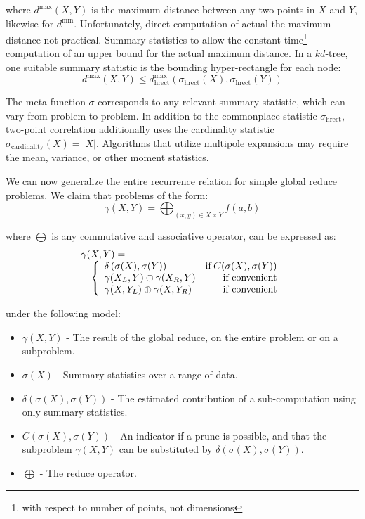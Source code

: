 \documentclass[times, 10pt,twocolumn]{article}
\DeclareMathOperator{\cardinality}{cardinality}
\DeclareMathOperator{\hrect}{hrect}
\DeclareMathOperator{\IF}{if}
\begin{document}
\noindent where $d^{\max}(X, Y)$ is the maximum distance between any two points in $X$ and $Y$, likewise for $d^{\min}$.
Unfortunately, direct computation of actual the maximum distance not practical.
Summary statistics to allow the constant-time\footnote{with respect to number of points, not dimensions} computation of an upper bound for the actual maximum distance.
In a $kd$-tree, one suitable summary statistic is the bounding hyper-rectangle for each node:
\begin{equation}
d^{\max}(X, Y) \leq d^{\max}_{\hrect}(\sigma_{\hrect}(X), \sigma_{\hrect}(Y))
\end{equation}

\noindent The meta-function $\sigma$ corresponds to any relevant summary statistic, which can vary from problem to problem.
In addition to the commonplace statistic $\sigma_{\hrect}$, two-point correlation additionally uses the cardinality statistic $\sigma_{\cardinality}(X) = |X|$.
Algorithms that utilize multipole expansions may require the mean, variance, or other moment statistics.

We can now generalize the entire recurrence relation for simple global reduce problems.
We claim that problems of the form:
\begin{equation}
  \gamma(X, Y) = \bigoplus_{(x, y) \in X \times Y} f(a,b)
\end{equation}

\noindent where $\bigoplus$ is any commutative and associative operator, can be expressed as:
\begin{equation}
\label{eqn:global_intrinsic}
 \begin{array}{ll}
  \lefteqn{\gamma(X, Y) =}
  \\
  & \left\{
    \begin{array}{lr}
      \delta \left( \sigma(X), \sigma(Y) \right) & \IF C(\sigma(X), \sigma(Y))
      \\
      \gamma(X_L, Y) \oplus \gamma(X_R, Y) & \mbox{if convenient}
      \\
      \gamma(X, Y_L) \oplus  \gamma(X, Y_R) & \mbox{if convenient}
    \end{array}
  \right.
 \end{array}
\end{equation}

\noindent under the following model:
\begin{itemize}
  \item $\gamma(X, Y)$ - The result of the global reduce, on the entire problem or on a subproblem.
  \item $\sigma(X)$ - Summary statistics over a range of data.
  \item $\delta(\sigma(X), \sigma(Y))$ - The estimated contribution of a sub-computation using only summary statistics.
  \item $C(\sigma(X), \sigma(Y))$ - An indicator if a prune is possible, and that the subproblem $\gamma(X, Y)$ can be substituted by $\delta(\sigma(X), \sigma(Y))$.
  \item $\bigoplus$ - The reduce operator.
\end{itemize}
\end{document}
